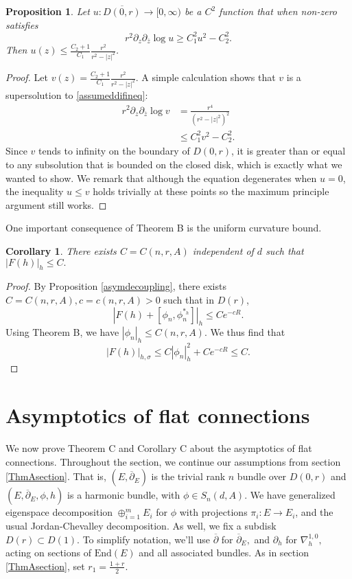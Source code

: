 \documentclass[10pt]{amsart}
\newtheorem{prop}[thm]{Proposition}
\newtheorem{cor}[thm]{Corollary}
\theoremstyle{definition}
\begin{document}
\begin{prop} \label{maxprinc}
 Let $u:\overline{D(0,r)}\to [0,\infty)$ be a $C^2$ function that when non-zero satisfies 
    \begin{equation}\label{assumeddifineq}
        r^2\partial_z\partial_{\overline{z}}\log u \geq C^2_1u^2-C^2_2.
    \end{equation}
Then $u(z) \leq \frac{C_2 + 1}{C_1} \frac{r^2}{r^2 - |z|^2}$.
\end{prop}

\begin{proof}
Let $v(z) = \frac{C_2 + 1}{C_1} \frac{r^2}{r^2 - |z|^2}$. A simple calculation shows that $v$ is a supersolution to \eqref{assumeddifineq}:
\begin{align*}
    r^2\partial_z\partial_{\overline{z}}\log v &= \frac{r^4}{(r^2 - |z|^2)^2} \\
    &\leq C_1^2 v^2 - C_2^2.
\end{align*}
Since $v$ tends to infinity on the boundary of $D(0,r)$, it is greater than or equal to any subsolution that is bounded on the closed disk, which is exactly what we wanted to show. We remark that although the equation degenerates when $u=0$, the inequality $u \leq v$ holds trivially at these points so the maximum principle argument still works.
\end{proof}

One important consequence of Theorem B is the uniform curvature bound.
\begin{cor}\label{localbound}
    There exists $C=C(n,r,A)$ independent of $d$ such that $|F(h)|_h\leq C.$
\end{cor}
\begin{proof}
    By Proposition \ref{asymdecoupling}, there exists $C=C(n,r,A),c=c(n,r,A)>0$ such that in $D(r)$, $$|F(h)+[\phi_n,\phi_n^{*_h}]|_{h}\leq Ce^{-cR}.$$ Using Theorem B, we have $|\phi_n|_{h}\leq C(n,r,A)$. We thus find that $$|F(h)|_{h,\sigma}\leq C|\phi_n|_{ h}^2 + Ce^{-cR}\leq C.$$ 
\end{proof}










\section{Asymptotics of flat connections}
We now prove Theorem C and Corollary C about the asymptotics of flat connections. Throughout the section, we continue our assumptions from section \ref{ThmAsection}. That is, $(E,\overline{\partial}_E)$ is the trivial rank $n$ bundle over $D(0,r)$ and $(E,\overline{\partial}_E,\phi,h)$ is a harmonic bundle, with $\phi \in S_n(d,A).$ We have generalized  eigenspace decomposition $\oplus_{i=1}^m E_i$ for $\phi$ with projections $\pi_i:E\to E_i$, and the usual Jordan-Chevalley decomposition. As well, we fix a subdisk $D(r)\subset D(1).$ To simplify notation, we'll use $\overline{\partial}$ for $\overline{\partial}_E,$ and $\partial_h$ for $\nabla_h^{1,0},$ acting on sections of $\textrm{End}(E)$ and all associated bundles.  As in section \ref{ThmAsection}, set $r_1=\frac{1+r}{2}.$ 
\end{document}
